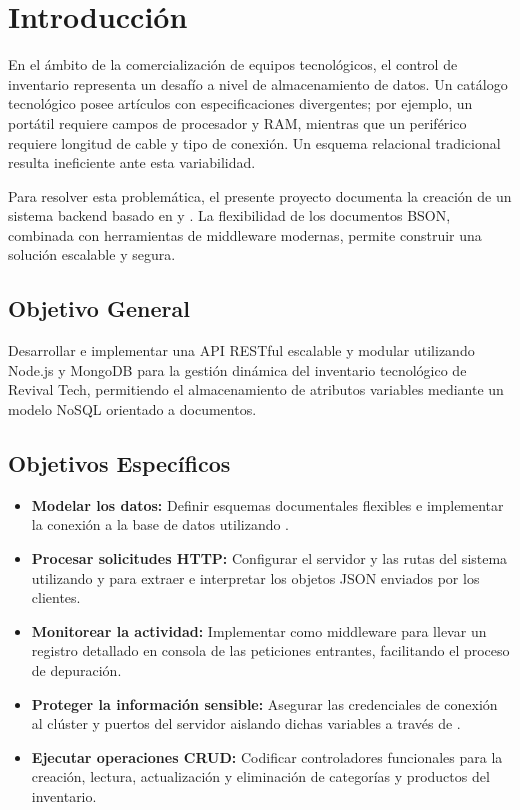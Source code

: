 \chapter{Introducción}

En el ámbito de la comercialización de equipos tecnológicos, el control de inventario representa un desafío a nivel de almacenamiento de datos. Un catálogo tecnológico posee artículos con especificaciones divergentes; por ejemplo, un portátil requiere campos de procesador y RAM, mientras que un periférico requiere longitud de cable y tipo de conexión. Un esquema relacional tradicional resulta ineficiente ante esta variabilidad. 

Para resolver esta problemática, el presente proyecto documenta la creación de un sistema backend basado en  y . La flexibilidad de los documentos BSON, combinada con herramientas de middleware modernas, permite construir una solución escalable y segura.

\section{Objetivo General}
Desarrollar e implementar una API RESTful escalable y modular utilizando Node.js y MongoDB para la gestión dinámica del inventario tecnológico de Revival Tech, permitiendo el almacenamiento de atributos variables mediante un modelo NoSQL orientado a documentos.

\section{Objetivos Específicos}
\begin{itemize}
    \item \textbf{Modelar los datos:} Definir esquemas documentales flexibles e implementar la conexión a la base de datos utilizando .
    \item \textbf{Procesar solicitudes HTTP:} Configurar el servidor y las rutas del sistema utilizando  y  para extraer e interpretar los objetos JSON enviados por los clientes.
    \item \textbf{Monitorear la actividad:} Implementar  como middleware para llevar un registro detallado en consola de las peticiones entrantes, facilitando el proceso de depuración.
    \item \textbf{Proteger la información sensible:} Asegurar las credenciales de conexión al clúster y puertos del servidor aislando dichas variables a través de .
    \item \textbf{Ejecutar operaciones CRUD:} Codificar controladores funcionales para la creación, lectura, actualización y eliminación de categorías y productos del inventario.
\end{itemize}
